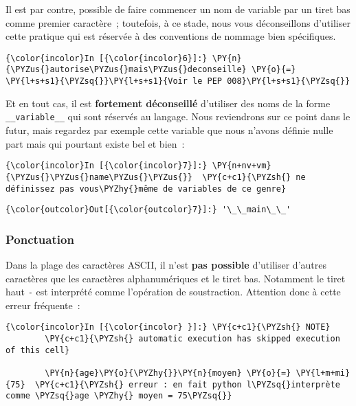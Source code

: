     Il est par contre, possible de faire commencer un nom de variable par un
tiret bas comme premier caractère~; toutefois, à ce stade, nous vous
déconseillons d'utiliser cette pratique qui est réservée à des
conventions de nommage bien spécifiques.

    \begin{Verbatim}[commandchars=\\\{\}]
{\color{incolor}In [{\color{incolor}6}]:} \PY{n}{\PYZus{}autorise\PYZus{}mais\PYZus{}deconseille} \PY{o}{=} \PY{l+s+s1}{\PYZsq{}}\PY{l+s+s1}{Voir le PEP 008}\PY{l+s+s1}{\PYZsq{}}
\end{Verbatim}


    Et en tout cas, il est \textbf{fortement déconseillé} d'utiliser des
noms de la forme \texttt{\_\_variable\_\_} qui sont réservés au langage.
Nous reviendrons sur ce point dans le futur, mais regardez par exemple
cette variable que nous n'avons définie nulle part mais qui pourtant
existe bel et bien~:

    \begin{Verbatim}[commandchars=\\\{\}]
{\color{incolor}In [{\color{incolor}7}]:} \PY{n+nv+vm}{\PYZus{}\PYZus{}name\PYZus{}\PYZus{}}  \PY{c+c1}{\PYZsh{} ne définissez pas vous\PYZhy{}même de variables de ce genre}
\end{Verbatim}


\begin{Verbatim}[commandchars=\\\{\}]
{\color{outcolor}Out[{\color{outcolor}7}]:} '\_\_main\_\_'
\end{Verbatim}
            
    \hypertarget{ponctuation}{%
\subsubsection{Ponctuation}\label{ponctuation}}

    Dans la plage des caractères ASCII, il n'est \textbf{pas possible}
d'utiliser d'autres caractères que les caractères alphanumériques et le
tiret bas. Notamment le tiret haut \texttt{-} est interprété comme
l'opération de soustraction. Attention donc à cette erreur fréquente~:

    \begin{Verbatim}[commandchars=\\\{\}]
{\color{incolor}In [{\color{incolor} }]:} \PY{c+c1}{\PYZsh{} NOTE}
        \PY{c+c1}{\PYZsh{} automatic execution has skipped execution of this cell}
        
        \PY{n}{age}\PY{o}{\PYZhy{}}\PY{n}{moyen} \PY{o}{=} \PY{l+m+mi}{75}  \PY{c+c1}{\PYZsh{} erreur : en fait python l\PYZsq{}interprète comme \PYZsq{}age \PYZhy{} moyen = 75\PYZsq{}}
\end{Verbatim}



